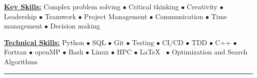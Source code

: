 \vspace*{-5mm}
\begin{multicols}{2}
    \begin{spacing}{1}
        \href{.}{\bf Key Skills:}
        Complex problem solving $\bullet$ Critical thinking $\bullet$ Creativity $\bullet$ Leadership $\bullet$ Teamwork $\bullet$ Project Management $\bullet$ Communication $\bullet$ Time management $\bullet$ Decision making

        \href{.}{\bf Technical Skills:}
        Python $\bullet$ SQL $\bullet$ Git $\bullet$ Testing $\bullet$ CI/CD $\bullet$ TDD $\bullet$ C++ $\bullet$ Fortran $\bullet$ openMP $\bullet$ Bash $\bullet$ Linux $\bullet$ HPC $\bullet$ \LaTeX~ $\bullet$ Optimization and Search Algorithms
    \end{spacing}
\end{multicols}

\vspace*{-10mm}
\begin{center}
    \par\rule{1.0\textwidth}{0.6pt}
\end{center}
\vspace*{-8mm}